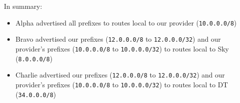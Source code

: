 In summary:

\begin{itemize}
    \item Alpha advertised all prefixes to routes local to our provider
    (\texttt{10.0.0.0/8})

    \item Bravo advertised our prefixes (\texttt{12.0.0.0/8} to \texttt
    {12.0.0.0/32}) and our provider's prefixes (\texttt{10.0.0.0/8} to
    \texttt{10.0.0.0/32}) to routes local to Sky (\texttt{8.0.0.0/8})

    \item Charlie advertised our prefixes (\texttt{12.0.0.0/8} to \texttt
    {12.0.0.0/32}) and our provider's prefixes (\texttt{10.0.0.0/8} to \texttt
    {10.0.0.0/32}) to routes local to DT (\texttt{34.0.0.0/8})
\end{itemize}